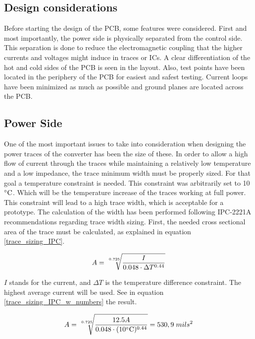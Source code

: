 \subsection{Design considerations} \label{PCB_Considerations}
Before starting the design of the PCB, some features were considered. First and most importantly, the power side is physically separated from the control side. This separation is done to reduce the electromagnetic coupling that the higher currents and voltages might induce in traces or ICs. A clear differentiation of the hot and cold sides of the PCB is seen in the layout.  Also, test points have been located in the periphery of the PCB for easiest and safest testing. Current loops have been minimized as much as possible and ground planes are located across the PCB.

\subsection{Power Side} \label{PCB_Power}
One of the most important issues to take into consideration when designing the power traces of the converter has been the size of these. In order to allow a high flow of current through the traces while maintaining a relatively low temperature and a low impedance, the trace minimum width must be properly sized. For that goal a temperature constraint is needed. This constraint was arbitrarily set to 10$\decC$. Which will be the temperature increase of the traces working at full power. This constraint will lead to a high trace width, which is acceptable for a prototype.
The calculation of the width has been performed following IPC-2221A\cite{PCB_standard} recommendations regarding trace width sizing. First, the needed cross sectional area of the trace must be calculated, as explained in equation \ref{trace_sizing_IPC}.

\begin{equation} \label{trace_sizing_IPC}
A = \sqrt[\leftroot{-2}\uproot{2}0.725]{\frac{I}{0.048\cdot \Delta T^{0.44}}}
\end{equation}

 $I$ stands for the current, and $\Delta T$ is the temperature difference constraint. The highest average current will be used. See in equation \ref{trace_sizing_IPC_w_numbers} the result.
 
 \begin{equation} \label{trace_sizing_IPC_w_numbers}
 A = \sqrt[\leftroot{-2}\uproot{2}0.725]{\frac{12.5 A}{0.048\cdot (10\decC)^{0.44}}} = 530,9 \; mils^2
 \end{equation}
 
